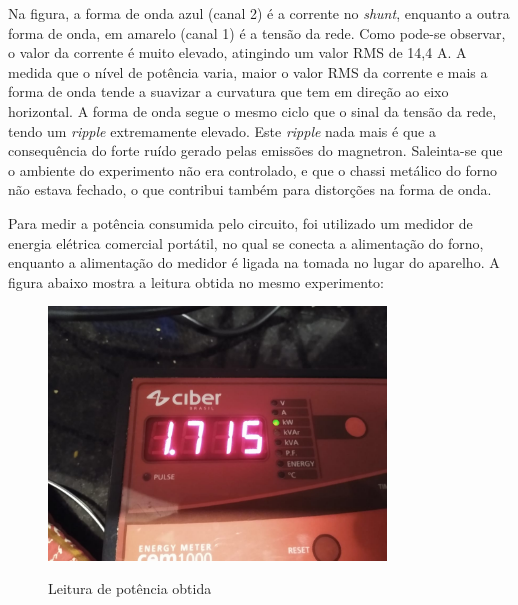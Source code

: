 Na figura, a forma de onda azul (canal 2) é a corrente no \textit{shunt}, enquanto a outra forma de onda, em amarelo (canal 1) é a tensão da rede. Como pode-se observar, o valor da corrente é muito elevado, atingindo um valor RMS de 14,4 A.  A medida que o nível de potência varia, maior o valor RMS da corrente e mais a forma de onda tende a suavizar a curvatura que tem em direção ao eixo horizontal. A forma de onda segue o mesmo ciclo que o sinal da tensão da rede, tendo um \textit{ripple} extremamente elevado. Este \textit{ripple} nada mais é que a consequência do forte ruído gerado pelas emissões do magnetron. Saleinta-se que o ambiente do experimento não era controlado, e que o chassi metálico do forno não estava fechado, o que contribui também para distorções na forma de onda.

Para medir a potência consumida pelo circuito, foi utilizado um medidor de energia elétrica comercial portátil, no qual se conecta a alimentação do forno, enquanto a alimentação do medidor é ligada na tomada no lugar do aparelho. A figura abaixo mostra a leitura obtida no mesmo experimento:

\begin{figure}[H]
    \centering
    \caption{Leitura de potência obtida}
    \includegraphics[width=0.8\textwidth]{./dados/figuras/medida_potencia_full}
    \label{fig:figura-medida_potencia_full}
\end{figure}

